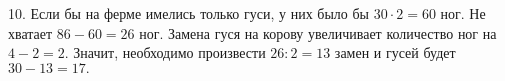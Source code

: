 10. Если бы на ферме имелись только гуси, у них было бы  $30\cdot2=60$ ног. Не хватает $86-60=26$ ног. Замена гуся на корову увеличивает количество ног на $4-2=2.$
Значит, необходимо произвести $26:2=13$ замен и гусей будет $30-13=17.$\\
